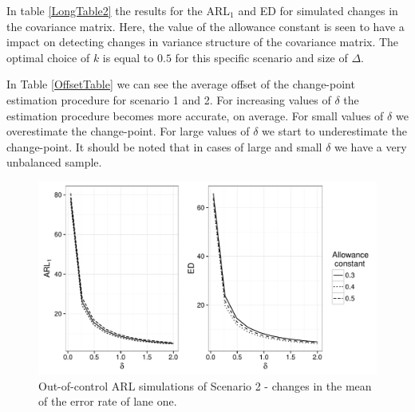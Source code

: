 \documentclass[a4paper,11pt,fleqn,twoside,notitlepage]{report}\usepackage[]{graphicx}\usepackage[]{color}
\makeatletter
\def\maxwidth{ %
  \ifdim\Gin@nat@width>\linewidth
    \linewidth
  \else
    \Gin@nat@width
  \fi
}
\newenvironment{knitrout}{}{} %
\makeatother
\begin{document}
In table \ref{LongTable2} the results for the ARL$_1$ and ED for simulated changes in the covariance matrix. Here, the value of the allowance constant is seen to have a impact on detecting changes in variance structure of the covariance matrix. The optimal choice of $k$ is equal to $0.5$ for this specific scenario and size of $\Delta$. 

In Table \ref{OffsetTable} we can see the average offset of the change-point estimation procedure for scenario 1 and 2. For increasing values of $\delta$ the estimation procedure becomes more accurate, on average. For small values of $\delta$ we overestimate the change-point. For large values of $\delta$ we start to underestimate the change-point. It should be noted that in cases of large and small $\delta$ we have a very unbalanced sample. 

\begin{knitrout}
\color{fgcolor}\begin{figure}[!ht]
\includegraphics[width=\maxwidth]{figure/ARL1meanCase2-1} \caption[Out-of-control ARL simulations of Scenario 2 - changes in the mean of the error rate of lane one]{Out-of-control ARL simulations of Scenario 2 - changes in the mean of the error rate of lane one.}\label{fig:ARL1meanCase2}
\end{figure}


\end{knitrout}
\end{document}
